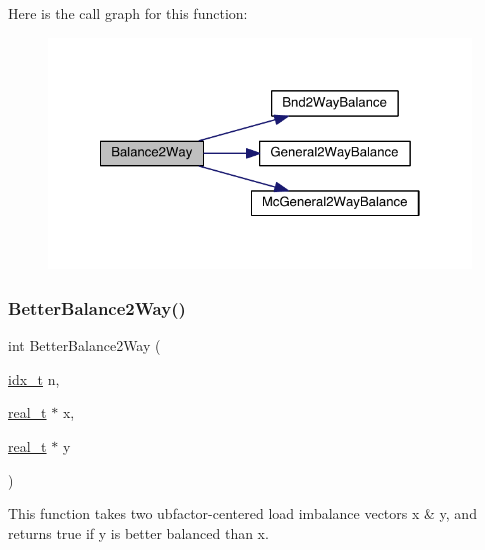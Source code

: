 Here is the call graph for this function\+:\nopagebreak
\begin{figure}[H]
\begin{center}
\leavevmode
\includegraphics[width=322pt]{a00945_a11bd5be7764194a2bb8d6cfe580a30b8_cgraph}
\end{center}
\end{figure}
\mbox{\label{a00945_a9c21f030c536d46b47d12116cc295645}} 
\subsubsection{\texorpdfstring{Better\+Balance2\+Way()}{BetterBalance2Way()}}
{\footnotesize\ttfamily int Better\+Balance2\+Way (\begin{DoxyParamCaption}\item[{\hyperlink{a00876_aaa5262be3e700770163401acb0150f52}{idx\+\_\+t}}]{n,  }\item[{\hyperlink{a00876_a1924a4f6907cc3833213aba1f07fcbe9}{real\+\_\+t} $\ast$}]{x,  }\item[{\hyperlink{a00876_a1924a4f6907cc3833213aba1f07fcbe9}{real\+\_\+t} $\ast$}]{y }\end{DoxyParamCaption})}

This function takes two ubfactor-\/centered load imbalance vectors x \& y, and returns true if y is better balanced than x. \mbox{\label{a00945_a6fda1ab8ecf30cc57c27c4f6ee56f47b}} 
